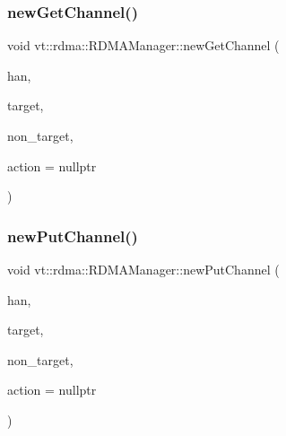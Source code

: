 \mbox{\label{structvt_1_1rdma_1_1_r_d_m_a_manager_a6a3ecf9512915681304ccd0126ec531f}} 
\subsubsection{\texorpdfstring{new\+Get\+Channel()}{newGetChannel()}\hspace{0.1cm}{\footnotesize\ttfamily [2/2]}}
{\footnotesize\ttfamily void vt\+::rdma\+::\+R\+D\+M\+A\+Manager\+::new\+Get\+Channel (\begin{DoxyParamCaption}\item[{\hyperlink{namespacevt_a10442579ec4e7ebef223818e64bcf908}{R\+D\+M\+A\+\_\+\+Handle\+Type} const \&}]{han,  }\item[{\hyperlink{namespacevt_a866da9d0efc19c0a1ce79e9e492f47e2}{Node\+Type} const \&}]{target,  }\item[{\hyperlink{namespacevt_a866da9d0efc19c0a1ce79e9e492f47e2}{Node\+Type} const \&}]{non\+\_\+target,  }\item[{\hyperlink{namespacevt_ae0a5a7b18cc99d7b732cb4d44f46b0f3}{Action\+Type} const \&}]{action = {\ttfamily nullptr} }\end{DoxyParamCaption})\hspace{0.3cm}{\ttfamily [inline]}}

\mbox{\label{structvt_1_1rdma_1_1_r_d_m_a_manager_ae64c8e90dc45fcd44129e4c62f3b65ea}} 
\subsubsection{\texorpdfstring{new\+Put\+Channel()}{newPutChannel()}}
{\footnotesize\ttfamily void vt\+::rdma\+::\+R\+D\+M\+A\+Manager\+::new\+Put\+Channel (\begin{DoxyParamCaption}\item[{\hyperlink{namespacevt_a10442579ec4e7ebef223818e64bcf908}{R\+D\+M\+A\+\_\+\+Handle\+Type} const \&}]{han,  }\item[{\hyperlink{namespacevt_a866da9d0efc19c0a1ce79e9e492f47e2}{Node\+Type} const \&}]{target,  }\item[{\hyperlink{namespacevt_a866da9d0efc19c0a1ce79e9e492f47e2}{Node\+Type} const \&}]{non\+\_\+target,  }\item[{\hyperlink{namespacevt_ae0a5a7b18cc99d7b732cb4d44f46b0f3}{Action\+Type} const \&}]{action = {\ttfamily nullptr} }\end{DoxyParamCaption})\hspace{0.3cm}{\ttfamily [inline]}}

